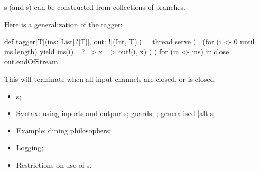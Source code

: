 \documentclass[notes,color]{sepslide0}
\begin{document}
\begin{slide}

s (and s) can be constructed from collections of
branches.

Here is a generalization of the tagger:
%
\begin{scala}
def tagger[T](ins: List[?[T]], out: ![(Int, T)]) = thread{
  serve ( 
    | (for (i <- 0 until ins.length) yield ins(i) =?=> { x => out!(i, x) })
  )
  for (in <- ins) in.close
  out.endOfStream
}
\end{scala}

This will terminate when all input channels are closed, or  is
closed. 
\end{slide}


\begin{slide}

\begin{itemize}
\item
{}s;

\item
Syntax: using inports and outports; guards; ; generalised |alt|s;

\item
Example: dining philosophers;

\item
Logging;


\item
Restrictions on use of s. 
\end{itemize}
\end{slide}
\end{document}
